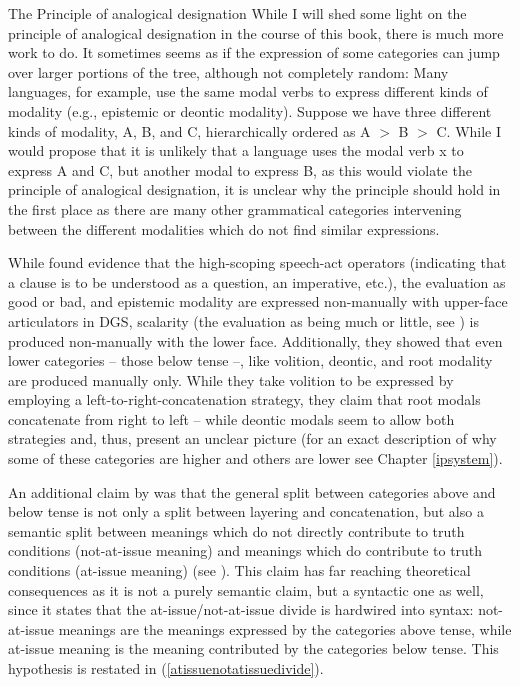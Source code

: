 \begin{savenotes}
\begin{digression}{The Principle of analogical designation}{}
While I will shed some light on the principle of analogical designation in the course of this book, there is much more work to do. It sometimes seems as if the expression of some categories can jump over larger portions of the tree, although not completely random: Many languages, for example, use the same modal verbs to express different kinds of modality (e.g., epistemic or deontic modality). Suppose we have three different kinds of modality, A, B, and C, hierarchically ordered as A $>$ B $>$ C. While I would propose that it is unlikely that a language uses the modal verb x to express A and C, but another modal to express B, as this would violate the principle of analogical designation, it is unclear why the principle should hold in the first place as there are many other grammatical categories intervening between the different modalities which do not find similar expressions. 


\end{digression}
\end{savenotes}

\noindent While \citet{bross2017scope} found evidence that the high-scoping speech-act operators (indicating that a clause is to be understood as a question, an imperative, etc.), the evaluation as good or bad, and epistemic modality are expressed non-manually with upper-face articulators in DGS, scalarity (the evaluation as being much or little, see \citealt{hole2015distributed}) is produced non-manually with the lower face. Additionally, they showed that even lower categories -- those below tense --, like volition, deontic, and root modality are produced manually only. While they take volition to be expressed by employing a left-to-right-concatenation strategy, they claim that root modals concatenate from right to left -- while deontic modals seem to allow both strategies and, thus, present an unclear picture (for an exact description of why some of these categories are higher and others are lower see Chapter \ref{ipsystem}).

An additional claim by \citet{bross2017scope} was that the general split between categories above and below tense is not only a split between layering and concatenation, but also a semantic split between meanings which do not directly contribute to truth conditions (not-at-issue meaning) and meanings which do contribute to truth conditions (at-issue meaning) (see \citealt{simons2010projects, tonhauser2013toward}). This claim has far reaching theoretical consequences as it is not a purely semantic claim, but a syntactic one as well, since it states that the at-issue/not-at-issue divide is hardwired into syntax: not-at-issue meanings are the meanings expressed by the categories above tense, while at-issue meaning is the meaning contributed by the categories below tense. This hypothesis is restated in (\ref{atissuenotatissuedivide}).


